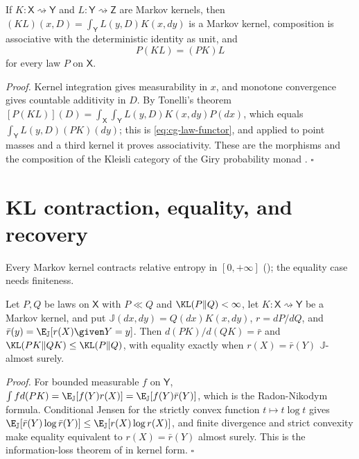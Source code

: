 \label{eq:cg-kernel-composition}
If $K:\mathsf X\rightsquigarrow\mathsf Y$ and $L:\mathsf Y\rightsquigarrow\mathsf Z$ are Markov
kernels, then $(KL)(x,D)=\int_{\mathsf Y}L(y,D)K(x,dy)$ is a Markov kernel, composition is
associative with the deterministic identity as unit, and
\begin{equation}
P(KL)=(PK)L
\label{eq:cg-law-functor}
\end{equation}
for every law $P$ on $\mathsf X$. 

\noindent\emph{Proof.}
Kernel integration gives measurability in $x$, and monotone convergence gives countable additivity
in $D$. By Tonelli's theorem $[P(KL)](D)=\int_{\mathsf X}\int_{\mathsf Y}L(y,D)K(x,dy)P(dx)$, which
equals $\int_{\mathsf Y}L(y,D)(PK)(dy)$; this is \eqref{eq:cg-law-functor}, and applied to point
masses and a third kernel it proves associativity. These are the morphisms and the composition of
the Kleisli category of the Giry probability monad \citep{Giry1982}. $\square$

\section{KL contraction, equality, and recovery}
\label{sec:cg-kl-recovery}

Every Markov kernel contracts relative entropy in $[0,+\infty]$ ();
the equality case needs finiteness.

\label{eq:cg-kl-dpi}
\label{eq:cg-kl-equality}
Let $P,Q$ be laws on $\mathsf X$ with $P\ll Q$ and $\KL(P\Vert Q)<\infty$, let
$K:\mathsf X\rightsquigarrow\mathsf Y$ be a Markov kernel, and put $\mathbb J(dx,dy)=Q(dx)K(x,dy)$,
$r=dP/dQ$, and $\bar r(y)=\E_{\mathbb J}[r(X)\given Y=y]$. Then $d(PK)/d(QK)=\bar r$ and
$\KL(PK\Vert QK)\leq\KL(P\Vert Q)$, with equality exactly when $r(X)=\bar r(Y)$
$\mathbb J$-almost surely. 

\noindent\emph{Proof.}
For bounded measurable $f$ on $\mathsf Y$,
$\int f d(PK)=\E_{\mathbb J}[f(Y)r(X)]=\E_{\mathbb J}[f(Y)\bar r(Y)]$, which is the
Radon-Nikodym formula. Conditional Jensen for the strictly convex function $t\mapsto t\log t$
gives $\E_{\mathbb J}[\bar r(Y)\log\bar r(Y)]\leq\E_{\mathbb J}[r(X)\log r(X)]$, and finite divergence
and strict convexity make equality equivalent to $r(X)=\bar r(Y)$ almost surely. This is the
information-loss theorem of \citet{Kullback1951,Csiszar1967} in kernel form. $\square$


